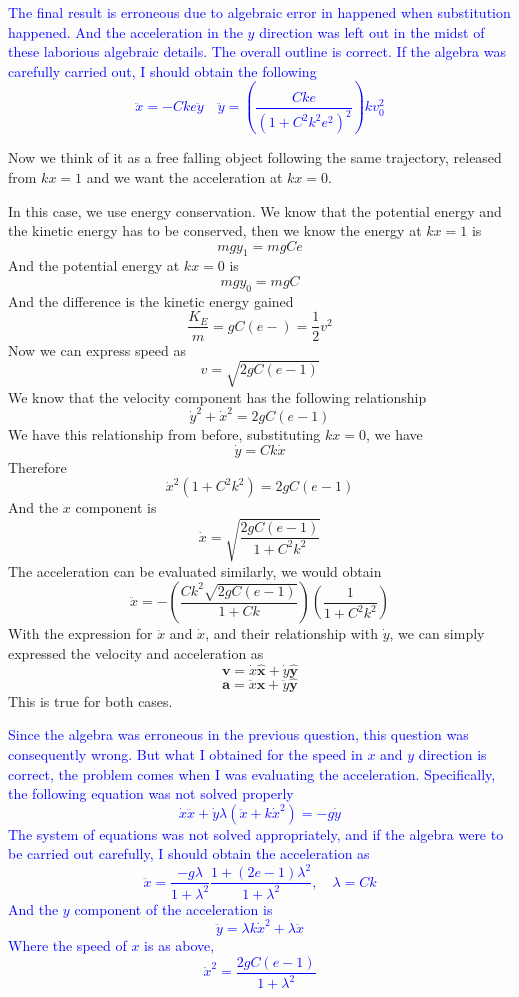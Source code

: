 \documentclass[12pt]{article}
\newcommand{\paren}[1]{\left( #1 \right)}
\newcommand{\unx}{\hat{\mathbf{x}}}
\newcommand{\uny}{\hat{\mathbf{y}}}
\begin{document}
\textcolor{blue}{The final result is erroneous due to algebraic error in happened when substitution happened. And the acceleration in the $y$ direction was left out in the midst of these laborious algebraic details. The overall outline is correct. If the algebra was carefully carried out, I should obtain the following
\[
\ddot{x} = -Cke\ddot{y} \quad \ddot{y} = \paren{\frac{Cke}{\paren{1+C^2k^2e^2}^2}}kv_0^2
\]}

Now we think of it as a free falling object following the same trajectory, released from $kx=1$ and we want the acceleration at $kx=0$.

In this case, we use energy conservation. We know that the potential energy and the kinetic energy has to be conserved, then we know the energy at $kx=1$ is
\[
mgy_1 = mgCe
\]
And the potential energy at $kx=0$ is
\[
mgy_0 = mgC
\]
And the difference is the kinetic energy gained
\[
\frac{K_E}{m} = gC\paren{e-} = \frac{1}{2}v^2
\]
Now we can express speed as
\[
v=\sqrt{2gC\paren{e-1}}
\]
We know that the velocity component has the following relationship
\[
\dot{y}^2 + \dot{x}^2 = 2gC\paren{e-1}
\]
We have this relationship from before, substituting $kx=0$, we have
\[
\dot{y} = Ck\dot{x}
\]
Therefore
\[
\dot{x}^2\paren{1+C^2k^2} = 2gC\paren{e-1}
\]
And the $x$ component is
\[
\dot{x} = \sqrt{\frac{2gC\paren{e-1}}{1+C^2k^2}}
\]
The acceleration can be evaluated similarly, we would obtain 
\[
\ddot{x} = -\paren{\frac{Ck^2\sqrt{2gC\paren{e-1}}}{1+Ck}}\paren{\frac{1}{1+C^2k^2}}
\]
With the expression for $\ddot{x}$ and $\dot{x}$, and their relationship with $\dot{y}$, we can simply expressed the velocity and acceleration as
\[
\mathbf{v} = \dot{x}\unx + \dot{y}\uny
\]
\[
\mathbf{a} = \ddot{x}\unx + \ddot{y}\uny
\]
This is true for both cases.

\textcolor{blue}{Since the algebra was erroneous in the previous question, this question was consequently wrong. But what I obtained for the speed in $x$ and $y$ direction is correct, the problem comes when I was evaluating the acceleration. Specifically, the following equation was not solved properly
\[
\dot{x}\ddot{x} + \dot{y}\lambda\paren{\ddot{x}+k\dot{x}^2}=-g\dot{y}
\]
The system of equations was not solved appropriately, and if the algebra were to be carried out carefully, I should obtain the acceleration as
\[
\ddot{x} = \frac{-g\lambda}{1+\lambda^2}\frac{1+\paren{2e-1}\lambda^2}{1+\lambda^2}, \quad \lambda = Ck
\]
And the $y$ component of the acceleration is
\[
\ddot{y} = \lambda k \dot{x}^2 + \lambda\ddot{x} 
\]
Where the speed of $x$ is as above,
\[
\dot{x}^2 = \frac{2gC\paren{e-1}}{1+\lambda^2}
\]}
\end{document}
